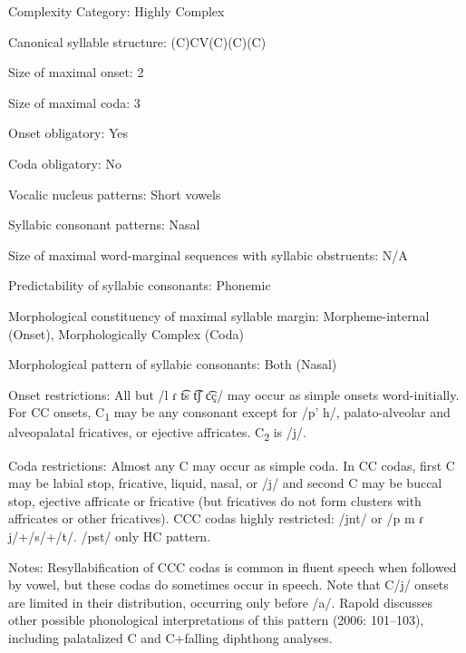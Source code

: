 {\begin{appendixdesc}
\item[Complexity Category:] Highly Complex

\item[Canonical syllable structure:] (C)CV(C)(C)(C) \citep[91--112]{Rapold2006}

\item[Size of maximal onset:] 2

\item[Size of maximal coda:] 3

\item[Onset obligatory:] Yes

\item[Coda obligatory:] No

\item[Vocalic nucleus patterns:] Short vowels

\item[Syllabic consonant patterns:] Nasal

\item[Size of maximal word-marginal sequences with syllabic obstruents:] N/A

\item[Predictability of syllabic consonants:] Phonemic

\item[Morphological constituency of maximal syllable margin:] Morpheme-internal (Onset), Morphologically Complex (Coda)

\item[Morphological pattern of syllabic consonants:] Both (Nasal)

\item[Onset restrictions:] All but /l ɾ t͡s t͡ʃ c͡ç/ may occur as simple onsets word-initially. For CC onsets, C\textsubscript{1} may be any consonant except for /p’ h/, palato-alveolar and alveopalatal fricatives, or ejective affricates. C\textsubscript{2} is /j/.

\item[Coda restrictions:] Almost any C may occur as simple coda. In CC codas, first C may be labial stop, fricative, liquid, nasal, or /j/ and second C may be buccal stop, ejective affricate or fricative (but fricatives do not form clusters with affricates or other fricatives). CCC codas highly restricted: /jnt/ or /p m ɾ j/+/s/+/t/. /pst/ only HC pattern.

\item[Notes:] Resyllabification of CCC codas is common in fluent speech when followed by vowel, but these codas do sometimes occur in speech. Note that C/j/ onsets are limited in their distribution, occurring only before /a/. Rapold discusses other possible phonological interpretations of this pattern (2006: 101--103), including palatalized C and C+falling diphthong analyses.
\end{appendixdesc}
}
